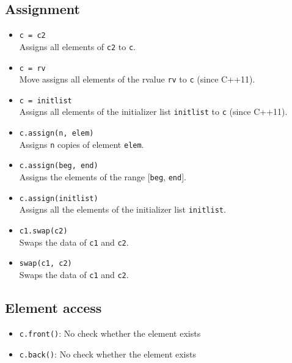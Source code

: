 \documentclass{report}
\begin{document}
      \subsection{Assignment}
\begin{itemize}
    \item \texttt{c = c2} \\
          Assigns all elements of \texttt{c2} to \texttt{c}.
          
    \item \texttt{c = rv} \\
          Move assigns all elements of the rvalue \texttt{rv} to \texttt{c} (since C++11).
          
    \item \texttt{c = initlist} \\
          Assigns all elements of the initializer list \texttt{initlist} to \texttt{c} (since C++11).
          
    \item \texttt{c.assign(n, elem)} \\
          Assigns \texttt{n} copies of element \texttt{elem}.
          
    \item \texttt{c.assign(beg, end)} \\
          Assigns the elements of the range [\texttt{beg}, \texttt{end}].
          
    \item \texttt{c.assign(initlist)} \\
          Assigns all the elements of the initializer list \texttt{initlist}.
          
    \item \texttt{c1.swap(c2)} \\
          Swaps the data of \texttt{c1} and \texttt{c2}.
          
    \item \texttt{swap(c1, c2)} \\
          Swaps the data of \texttt{c1} and \texttt{c2}.
\end{itemize}

\pagebreak 
\subsection{Element access}
\begin{itemize}
    \item \texttt{c.front()}: No check whether the element exists
    \item \texttt{c.back()}: No check whether the element exists
\end{itemize}
\end{document}
